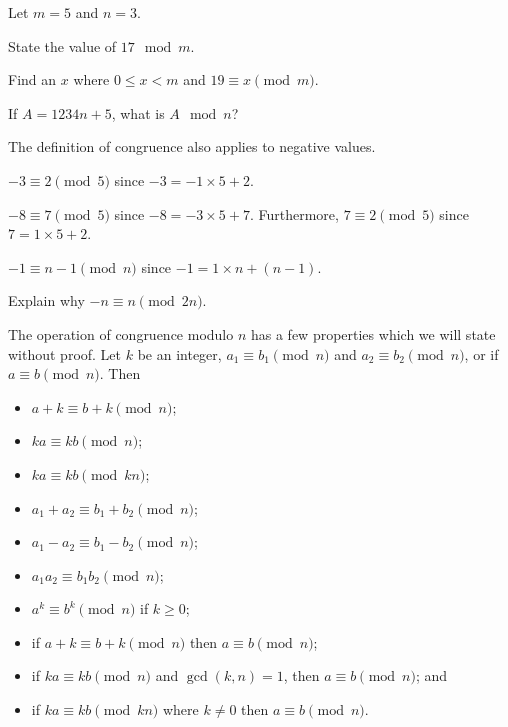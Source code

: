 \begin{exercise}
    Let $m = 5$ and $n = 3$.
    \begin{partquestions}{\alph*}
        \item State the value of $17 \mod m$.
        \item Find an $x$ where $0 \leq x < m$ and $19 \equiv x \pmod m$.
        \item If $A = 1234n + 5$, what is $A \mod n$?
    \end{partquestions}
\end{exercise}

The definition of congruence also applies to negative values.
\begin{example}
    $-3 \equiv 2 \pmod5$ since $-3 = -1\times5 + 2$.
\end{example}
\begin{example}
    $-8 \equiv 7 \pmod5$ since $-8 = -3\times5 + 7$. Furthermore, $7 \equiv 2 \pmod5$ since $7 = 1\times5 + 2$.
\end{example}
\begin{example}
    $-1 \equiv n-1 \pmod{n}$ since $-1 = 1\times n + (n-1)$.
\end{example}

\begin{exercise}
    Explain why $-n \equiv n \pmod{2n}$.
\end{exercise}

The operation of congruence modulo $n$ has a few properties which we will state without proof. Let $k$ be an integer, $a_1 \equiv b_1 \pmod n$ and $a_2 \equiv b_2 \pmod n$, or if $a \equiv b \pmod n$. Then
\begin{itemize}
    \item $a + k \equiv b + k \pmod n$;
    \item $ka \equiv kb \pmod n$;
    \item $ka \equiv kb \pmod {kn}$;
    \item $a_1 + a_2 \equiv b_1 + b_2 \pmod n$;
    \item $a_1 - a_2 \equiv b_1 - b_2 \pmod n$;
    \item $a_1a_2 \equiv b_1b_2 \pmod n$;
    \item $a^k \equiv b^k \pmod n$ if $k \geq 0$;
    \item if $a+k \equiv b+k \pmod n$ then $a \equiv b \pmod n$;
    \item if $ka \equiv kb \pmod n$ and $\gcd(k, n) = 1$, then $a \equiv b \pmod n$; and
    \item if $ka \equiv kb \pmod{kn}$ where $k \neq 0$ then $a \equiv b \pmod n$.
\end{itemize}

